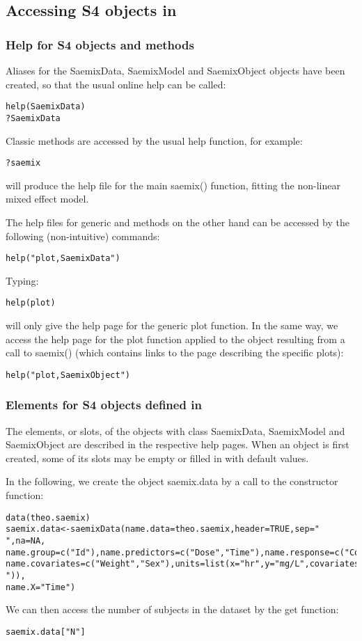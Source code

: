 \subsection{Accessing S4 objects in \monolix}

\subsubsection{Help for S4 objects and methods}

Aliases for the {\sf SaemixData}, {\sf SaemixModel} and {\sf SaemixObject} objects have been created, so that the usual online help can be called:
\begin{verbatim}
help(SaemixData)
?SaemixData
\end{verbatim}

Classic methods are accessed by the usual help function, for example:
\begin{verbatim}
?saemix
\end{verbatim}
will produce the help file for the main {\sf saemix()} function, fitting the non-linear mixed effect model.

The help files for generic and methods on the other hand can be accessed by the following (non-intuitive) commands:
\begin{verbatim}
help("plot,SaemixData")
\end{verbatim}
Typing:
\begin{verbatim}
help(plot)
\end{verbatim}
will only give the help page for the generic \R plot function. In the same way, we access the help page for the plot function applied to the object resulting from a call to {\sf saemix()} (which contains links to the page describing the specific plots):
\begin{verbatim}
help("plot,SaemixObject")
\end{verbatim}

\subsubsection{Elements for S4 objects defined in \monolix}

The elements, or slots, of the objects with class {\sf SaemixData}, {\sf SaemixModel} and {\sf SaemixObject} are described in the respective help pages. When an object is first created, some of its slots may be empty or filled in with default values.

In the following, we create the object {\sf saemix.data} by a call to the constructor function:
\begin{verbatim}
data(theo.saemix)
saemix.data<-saemixData(name.data=theo.saemix,header=TRUE,sep=" ",na=NA,
name.group=c("Id"),name.predictors=c("Dose","Time"),name.response=c("Concentration"),
name.covariates=c("Weight","Sex"),units=list(x="hr",y="mg/L",covariates=c("kg","-")),
name.X="Time")
\end{verbatim}
We can then access the number of subjects in the dataset by the get function:
\begin{verbatim}
saemix.data["N"]
\end{verbatim}

